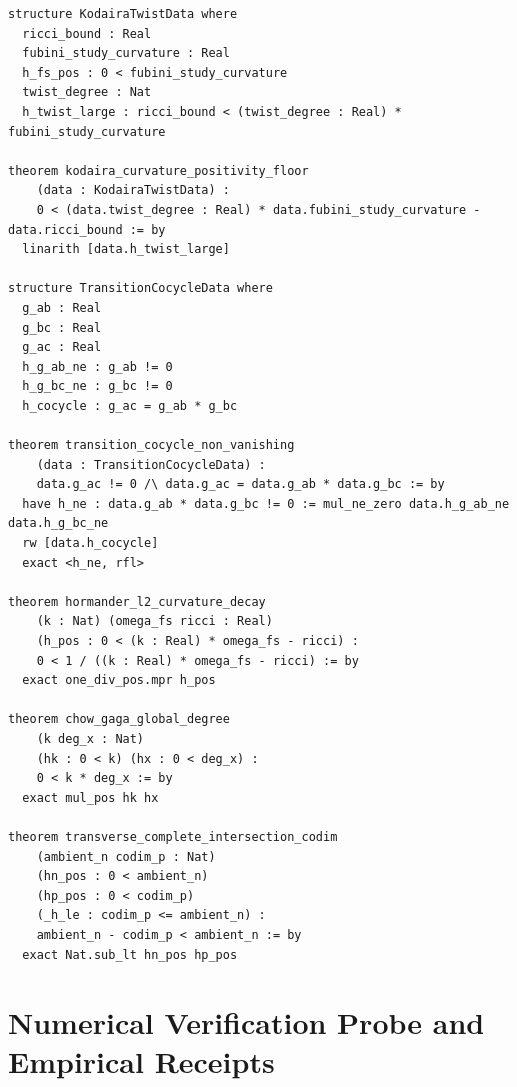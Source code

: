 \documentclass[11pt,a4paper]{article}
\theoremstyle{definition}
\begin{document}
\begin{lstlisting}[language=Lean4,caption={Lean 4 Formalization of Kodaira Cocycle Patching}]
structure KodairaTwistData where
  ricci_bound : Real
  fubini_study_curvature : Real
  h_fs_pos : 0 < fubini_study_curvature
  twist_degree : Nat
  h_twist_large : ricci_bound < (twist_degree : Real) * fubini_study_curvature

theorem kodaira_curvature_positivity_floor
    (data : KodairaTwistData) :
    0 < (data.twist_degree : Real) * data.fubini_study_curvature - data.ricci_bound := by
  linarith [data.h_twist_large]

structure TransitionCocycleData where
  g_ab : Real
  g_bc : Real
  g_ac : Real
  h_g_ab_ne : g_ab != 0
  h_g_bc_ne : g_bc != 0
  h_cocycle : g_ac = g_ab * g_bc

theorem transition_cocycle_non_vanishing
    (data : TransitionCocycleData) :
    data.g_ac != 0 /\ data.g_ac = data.g_ab * data.g_bc := by
  have h_ne : data.g_ab * data.g_bc != 0 := mul_ne_zero data.h_g_ab_ne data.h_g_bc_ne
  rw [data.h_cocycle]
  exact <h_ne, rfl>

theorem hormander_l2_curvature_decay
    (k : Nat) (omega_fs ricci : Real)
    (h_pos : 0 < (k : Real) * omega_fs - ricci) :
    0 < 1 / ((k : Real) * omega_fs - ricci) := by
  exact one_div_pos.mpr h_pos

theorem chow_gaga_global_degree
    (k deg_x : Nat)
    (hk : 0 < k) (hx : 0 < deg_x) :
    0 < k * deg_x := by
  exact mul_pos hk hx

theorem transverse_complete_intersection_codim
    (ambient_n codim_p : Nat)
    (hn_pos : 0 < ambient_n)
    (hp_pos : 0 < codim_p)
    (_h_le : codim_p <= ambient_n) :
    ambient_n - codim_p < ambient_n := by
  exact Nat.sub_lt hn_pos hp_pos
\end{lstlisting}

\section{Numerical Verification Probe and Empirical Receipts}
\end{document}
